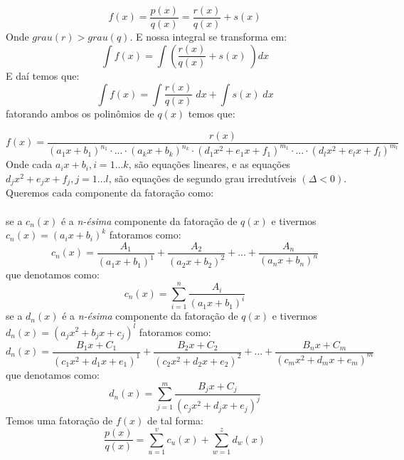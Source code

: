 \documentclass[14pt]{extreport}
\theoremstyle{definition}
\begin{document}
\begin{equation}
    f(x) = \frac{p(x)}{q(x)} = \frac{r(x)}{q(x)} + s(x) 
\end{equation}
Onde \(grau(r) > grau(q)\). E nossa integral se transforma em:
\begin{equation}
    \int f(x) = \int \left( \frac{r(x)}{q(x)} + s(x)\; \right) dx
\end{equation}
E daí temos que:
\begin{equation}
    \int f(x) = \int \frac{r(x)}{q(x)}\; dx + \int s(x)\; dx 
\end{equation}
fatorando ambos os polinômios de \(q(x)\) temos que:

\begin{equation}
    \textstyle
    f(x) = \frac{
        r(x)
    }{
        (a_1x + b_1)^{n_1}
        \cdot ... \cdot 
        (a_kx + b_k)^{n_k}
        \cdot
        (d_1x^2 + e_1x + f_1)^{m_1}
        \cdot ... \cdot 
        (d_lx^2 + e_lx + f_l)^{m_l}
    }
\end{equation}
Onde cada \(a_ix + b_i, i = 1...k\), são equações lineares, e as equações \(d_jx^2 + e_jx + f_j, j = 1...l\), são equações de segundo grau irredutíveis \(( \Delta < 0 )\).
Queremos cada componente da fatoração como:
\\
\\
se a \(c_n(x)\) é a \textit{n-ésima} componente da fatoração de \(q(x)\) e tivermos \(c_n(x) = (a_ix + b_i)^k\) fatoramos como:
\begin{equation*}
    c_n(x) = 
        \frac{A_1}{(a_1x + b_1)^1} +
        \frac{A_2}{(a_2x + b_2)^2} + ... + 
        \frac{A_n}{(a_nx + b_n)^n}
\end{equation*}
que denotamos como:
\begin{equation}
    c_n(x) = \sum_{ i = 1}^{n} \frac{A_i}{(a_1x + b_1)^i}
\end{equation}
se a \(d_n(x)\) é a \textit{n-ésima} componente da fatoração de \(q(x)\) e tivermos \(d_n(x) = (a_jx^2 + b_jx + c_j)^l\) fatoramos como:
\begin{equation}
    d_n(x) = 
        \frac{B_1x + C_1}{(c_1x^2 + d_1x + e_1)^1} +
        \frac{B_2x + C_2}{(c_2x^2 + d_2x + e_2)^2} + ... + 
        \frac{B_nx + C_m}{(c_mx^2 + d_mx + e_m)^m}
\end{equation}
que denotamos como:
\begin{equation}
    d_n(x) = \sum_{j = 1}^{m} \frac{B_jx + C_j}{(c_jx^2 + d_jx + e_j)^j}
\end{equation}
Temos uma fatoração de \(f(x)\) de tal forma:
\begin{equation}
    \frac{p(x)}{q(x)} =
    \sum_{u = 1}^{v} 
        c_u(x) + 
    \sum_{w = 1}^{z} 
        d_w(x)
\end{equation}
\end{document}
